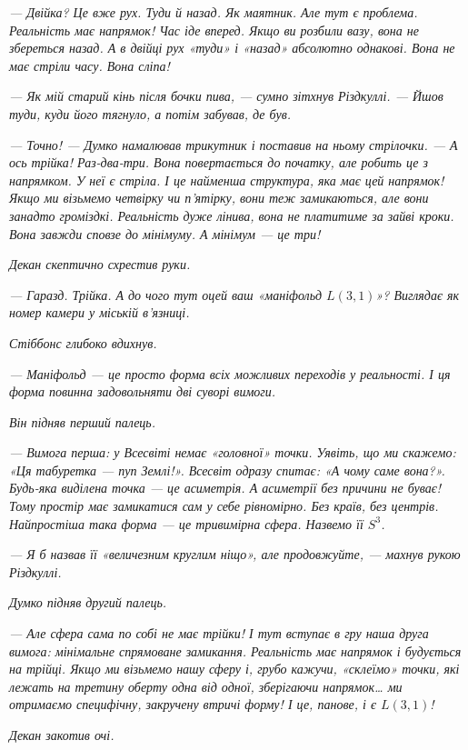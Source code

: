 \documentclass[12pt, a4paper, openany]{book}
\begin{document}
\begin{terrybox}
\textit{--- Двійка? Це вже рух. Туди й назад. Як маятник. Але тут є проблема. Реальність має напрямок! Час іде вперед. Якщо ви розбили вазу, вона не збереться назад. А в двійці рух «туди» і «назад» абсолютно однакові. Вона не має стріли часу. Вона сліпа!}

\textit{--- Як мій старий кінь після бочки пива, --- сумно зітхнув Різдкуллі. --- Йшов туди, куди його тягнуло, а потім забував, де був.}

\textit{--- Точно! --- Думко намалював трикутник і поставив на ньому стрілочки. --- А ось трійка! Раз-два-три. Вона повертається до початку, але робить це з напрямком. У неї є стріла. І це найменша структура, яка має цей напрямок! Якщо ми візьмемо четвірку чи п'ятірку, вони теж замикаються, але вони занадто громіздкі. Реальність дуже лінива, вона не платитиме за зайві кроки. Вона завжди сповзе до мінімуму. А мінімум --- це три!}

\textit{Декан скептично схрестив руки.}

\textit{--- Гаразд. Трійка. А до чого тут оцей ваш «маніфольд $L(3,1)$»? Виглядає як номер камери у міській в'язниці.}

\textit{Стіббонс глибоко вдихнув.}

\textit{--- Маніфольд --- це просто форма всіх можливих переходів у реальності. І ця форма повинна задовольняти дві суворі вимоги.}

\textit{Він підняв перший палець.}

\textit{--- Вимога перша: у Всесвіті немає «головної» точки. Уявіть, що ми скажемо: «Ця табуретка --- пуп Землі!». Всесвіт одразу спитає: «А чому саме вона?». Будь-яка виділена точка --- це асиметрія. А асиметрії без причини не буває! Тому простір має замикатися сам у себе рівномірно. Без країв, без центрів. Найпростіша така форма --- це тривимірна сфера. Назвемо її $S^3$.}

\textit{--- Я б назвав її «величезним круглим ніщо», але продовжуйте, --- махнув рукою Різдкуллі.}

\textit{Думко підняв другий палець.}

\textit{--- Але сфера сама по собі не має трійки! І тут вступає в гру наша друга вимога: мінімальне спрямоване замикання. Реальність має напрямок і будується на трійці. Якщо ми візьмемо нашу сферу і, грубо кажучи, «склеїмо» точки, які лежать на третину оберту одна від одної, зберігаючи напрямок\ldots{} ми отримаємо специфічну, закручену втричі форму! І це, панове, і є $L(3,1)$!}

\textit{Декан закотив очі.}


\end{terrybox}
\end{document}
